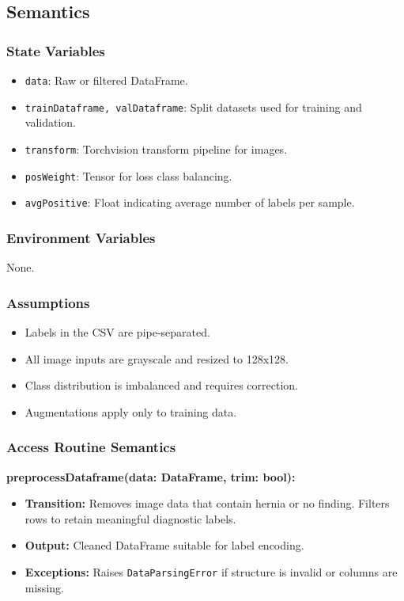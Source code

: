 \documentclass[12pt, titlepage]{article}
\begin{document}
\subsection{Semantics}

\subsubsection{State Variables}
\begin{itemize}
    \item \texttt{data}: Raw or filtered DataFrame.
    \item \texttt{trainDataframe, valDataframe}: Split datasets used for training and validation.
    \item \texttt{transform}: Torchvision transform pipeline for images.
    \item \texttt{posWeight}: Tensor for loss class balancing.
    \item \texttt{avgPositive}: Float indicating average number of labels per sample.
\end{itemize}

\subsubsection{Environment Variables}
None.

\subsubsection{Assumptions}
\begin{itemize}
    \item Labels in the CSV are pipe-separated.
    \item All image inputs are grayscale and resized to 128x128.
    \item Class distribution is imbalanced and requires correction.
    \item Augmentations apply only to training data.
\end{itemize}

\subsubsection{Access Routine Semantics}

\textbf{preprocessDataframe(data: DataFrame, trim: bool):}
\begin{itemize}
    \item \textbf{Transition:} Removes image data that contain hernia or no finding. Filters rows to retain meaningful diagnostic labels.
    \vspace{0.1cm}
    \item \textbf{Output:} Cleaned DataFrame suitable for label encoding.
    \vspace{0.1cm}
    \item \textbf{Exceptions:} Raises \texttt{DataParsingError} if structure is invalid or columns are missing.
\end{itemize}
\end{document}
